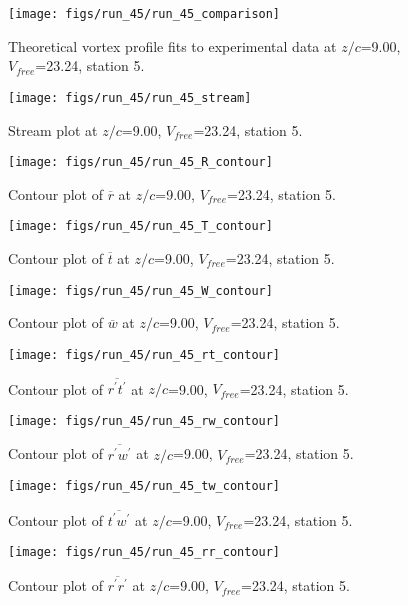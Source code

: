 \begin{figure}[H]
\centering
\texttt{[image: figs/run\_45/run\_45\_comparison]}
\caption{Theoretical vortex profile fits to experimental data at $z/c$=9.00, $V_{free}$=23.24, station 5.}
\end{figure}


\begin{figure}[H]
\centering
\texttt{[image: figs/run\_45/run\_45\_stream]}
\caption{Stream plot at $z/c$=9.00, $V_{free}$=23.24, station 5.}
\end{figure}


\begin{figure}[H]
\centering
\texttt{[image: figs/run\_45/run\_45\_R\_contour]}
\caption{Contour plot of $\overline{r}$ at $z/c$=9.00, $V_{free}$=23.24, station 5.}
\end{figure}


\begin{figure}[H]
\centering
\texttt{[image: figs/run\_45/run\_45\_T\_contour]}
\caption{Contour plot of $\overline{t}$ at $z/c$=9.00, $V_{free}$=23.24, station 5.}
\end{figure}


\begin{figure}[H]
\centering
\texttt{[image: figs/run\_45/run\_45\_W\_contour]}
\caption{Contour plot of $\overline{w}$ at $z/c$=9.00, $V_{free}$=23.24, station 5.}
\end{figure}


\begin{figure}[H]
\centering
\texttt{[image: figs/run\_45/run\_45\_rt\_contour]}
\caption{Contour plot of $\overline{r^\prime t^\prime}$ at $z/c$=9.00, $V_{free}$=23.24, station 5.}
\end{figure}


\begin{figure}[H]
\centering
\texttt{[image: figs/run\_45/run\_45\_rw\_contour]}
\caption{Contour plot of $\overline{r^\prime w^\prime}$ at $z/c$=9.00, $V_{free}$=23.24, station 5.}
\end{figure}


\begin{figure}[H]
\centering
\texttt{[image: figs/run\_45/run\_45\_tw\_contour]}
\caption{Contour plot of $\overline{t^\prime w^\prime}$ at $z/c$=9.00, $V_{free}$=23.24, station 5.}
\end{figure}


\begin{figure}[H]
\centering
\texttt{[image: figs/run\_45/run\_45\_rr\_contour]}
\caption{Contour plot of $\overline{r^\prime r^\prime}$ at $z/c$=9.00, $V_{free}$=23.24, station 5.}
\end{figure}


